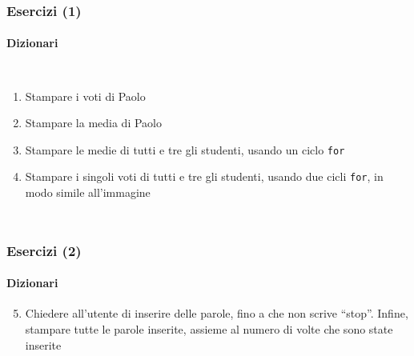 \begin{exerciseframe}
    \frametitle{Esercizi (1)}
    \framesubtitle{Dizionari}

    \begin{columns}
        \begin{enumerate}
            \item Stampare i voti di Paolo
            \item Stampare la media di Paolo
            \item Stampare le medie di tutti e tre gli studenti, usando un ciclo \texttt{for}
            \item Stampare i singoli voti di tutti e tre gli studenti, usando due cicli \texttt{for}, in modo simile all'immagine
        \end{enumerate}
        
        \centering
    \end{columns}
\end{exerciseframe}

\begin{exerciseframe}
    \frametitle{Esercizi (2)}
    \framesubtitle{Dizionari}

    \begin{enumerate}
        \setcounter{enumi}{4}
        \item Chiedere all'utente di inserire delle parole, fino a che non scrive ``stop''. Infine, stampare tutte le parole inserite, assieme al numero di volte che sono state inserite
    \end{enumerate}
\end{exerciseframe}
